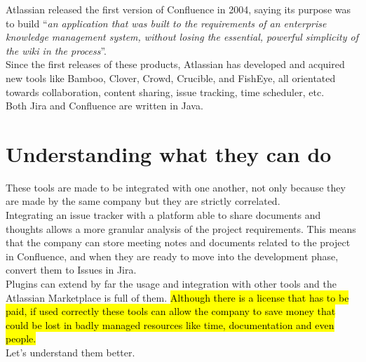 	Atlassian released the first version of Confluence in 2004, saying its purpose was to build ``\textit{an application that was built to the requirements of an enterprise knowledge management system, without losing the essential, powerful simplicity of the wiki in the process}''.\\
	Since the first releases of these products, Atlassian has developed and acquired new tools like Bamboo, Clover, Crowd, Crucible, and FishEye, all orientated towards collaboration, content sharing, issue tracking, time scheduler, etc.\\
	Both Jira and Confluence are written in Java.

\section{Understanding what they can do}
	These tools are made to be integrated with one another, not only because they are made by the same company but they are strictly correlated.\\
	Integrating an issue tracker with a platform able to share documents and thoughts allows a more granular analysis of the project requirements.
	This means that the company can store meeting notes and documents related to the project in Confluence, and when they are ready to move into the development phase, convert them to Issues in Jira.\\
	Plugins can extend by far the usage and integration with other tools and the Atlassian Marketplace is full of them.
	\hl{Although there is a license that has to be paid, if used correctly these tools can allow the company to save money that could be lost in badly managed resources like time, documentation and even people.}\\
	Let's understand them better.
	
